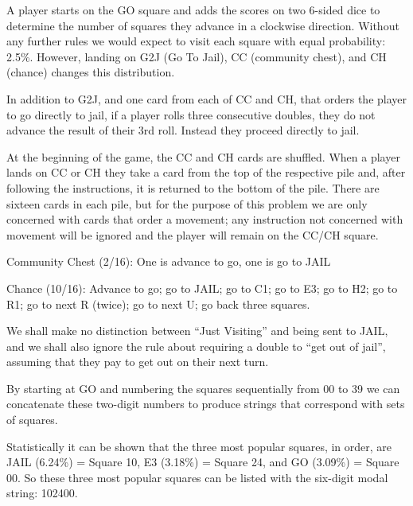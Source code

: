 A player starts on the GO square and adds the scores on two 6-sided dice to determine the number of squares they advance in a clockwise direction. Without any further rules we would expect to visit each square with equal probability: 2.5\%. However, landing on G2J (Go To Jail), CC (community chest), and CH (chance) changes this distribution.

In addition to G2J, and one card from each of CC and CH, that orders the player to go directly to jail, if a player rolls three consecutive doubles, they do not advance the result of their 3rd roll. Instead they proceed directly to jail.

At the beginning of the game, the CC and CH cards are shuffled. When a player lands on CC or CH they take a card from the top of the respective pile and, after following the instructions, it is returned to the bottom of the pile. There are sixteen cards in each pile, but for the purpose of this problem we are only concerned with cards that order a movement; any instruction not concerned with movement will be ignored and the player will remain on the CC/CH square.

Community Chest (2/16): One is advance to go, one is go to JAIL

Chance (10/16): Advance to go; go to JAIL; go to C1; go to E3; go to H2; go to R1; go to next R (twice);
go to next U; go back three squares.

We shall make no distinction between ``Just Visiting'' and being sent to JAIL, and we shall also ignore the rule about requiring a double to ``get out of jail'', assuming that they pay to get out on their next turn.

By starting at GO and numbering the squares sequentially from 00 to 39 we can concatenate these two-digit numbers to produce strings that correspond with sets of squares.

Statistically it can be shown that the three most popular squares, in order, are JAIL (6.24\%) = Square 10, E3 (3.18\%) = Square 24, and GO (3.09\%) = Square 00. So these three most popular squares can be listed with the six-digit modal string: 102400.

